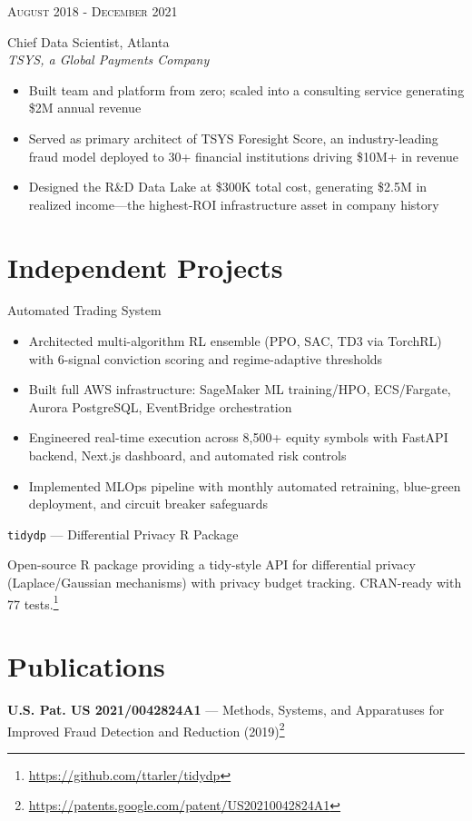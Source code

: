 \documentclass[9pt]{article} %
\begin{document}
\begin{minipage}[t]{0.55\textwidth}
{\raggedleft\textsc{August 2018 - December 2021}\par}

{\raggedright\large Chief Data Scientist, Atlanta\\ 
\textit{TSYS, a Global Payments Company}\\[1pt]}

\normalsize{
\begin{itemize}
\item Built team and platform from zero; scaled into a consulting service generating \$2M annual revenue
\item Served as primary architect of TSYS Foresight Score, an industry-leading fraud model deployed to 30+ financial institutions driving \$10M+ in revenue
\item Designed the R\&D Data Lake at \$300K total cost, generating \$2.5M in realized income---the highest-ROI infrastructure asset in company history
\end{itemize}}

\section{Independent Projects}

{\raggedright\large Automated Trading System\\[1pt]}

\normalsize{
\begin{itemize}
\item Architected multi-algorithm RL ensemble (PPO, SAC, TD3 via TorchRL) with 6-signal conviction scoring and regime-adaptive thresholds
\item Built full AWS infrastructure: SageMaker ML training/HPO, ECS/Fargate, Aurora PostgreSQL, EventBridge orchestration
\item Engineered real-time execution across 8,500+ equity symbols with FastAPI backend, Next.js dashboard, and automated risk controls
\item Implemented MLOps pipeline with monthly automated retraining, blue-green deployment, and circuit breaker safeguards
\end{itemize}}

{\raggedright\large \texttt{tidydp} --- Differential Privacy R Package\\[1pt]}

\normalsize{Open-source R package providing a tidy-style API for differential privacy (Laplace/Gaussian mechanisms) with privacy budget tracking. CRAN-ready with 77 tests.\footnote{\url{https://github.com/ttarler/tidydp}}}\\[6pt]

\section{Publications}

\textbf{U.S. Pat. US 2021/0042824A1} --- Methods, Systems, and Apparatuses for Improved Fraud Detection and Reduction (2019)\footnote{\url{https://patents.google.com/patent/US20210042824A1}}\\[6pt]
\end{minipage} %
\end{document}
